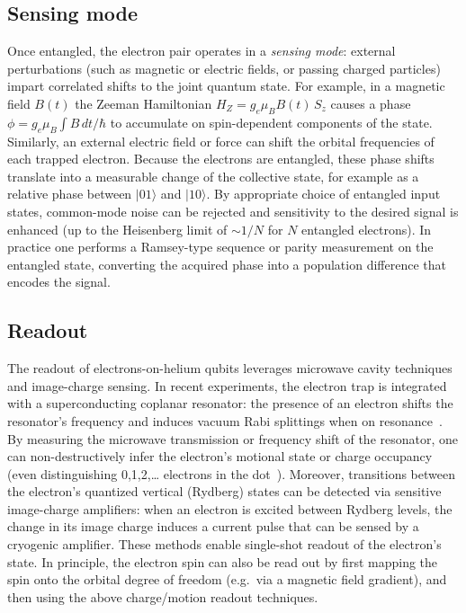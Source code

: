 \documentclass[fleqn,10pt]{wlscirep}
\begin{document}
\subsection{Sensing mode}

Once entangled, the electron pair operates in a {\it sensing mode}: external perturbations (such as magnetic or electric fields, or passing charged particles) impart correlated shifts to the joint quantum state.  For example, in a magnetic field $B(t)$ the Zeeman Hamiltonian $H_Z = g_e\mu_B B(t)\,S_z$ causes a phase $\phi = g_e\mu_B\int B\,dt/\hbar$ to accumulate on spin-dependent components of the state.  Similarly, an external electric field or force can shift the orbital frequencies of each trapped electron.  Because the electrons are entangled, these phase shifts translate into a measurable change of the collective state, for example as a relative phase between $|01\rangle$ and $|10\rangle$.  By appropriate choice of entangled input states, common-mode noise can be rejected and sensitivity to the desired signal is enhanced (up to the Heisenberg limit of $\sim1/N$ for $N$ entangled electrons).  In practice one performs a Ramsey-type sequence or parity measurement on the entangled state, converting the acquired phase into a population difference that encodes the signal.

\subsection{Readout}
The readout of electrons-on-helium qubits leverages microwave cavity techniques and image-charge sensing.  In recent experiments, the electron trap is integrated with a superconducting coplanar resonator: the presence of an electron shifts the resonator’s frequency and induces vacuum Rabi splittings when on resonance~\cite{koolstra2026strong}.  By measuring the microwave transmission or frequency shift of the resonator, one can non-destructively infer the electron’s motional state or charge occupancy (even distinguishing 0,1,2,… electrons in the dot~\cite{castoria2025}).  Moreover, transitions between the electron’s quantized vertical (Rydberg) states can be  detected via sensitive image-charge amplifiers: when an electron is excited between Rydberg levels, the change in its image charge induces a current pulse that can be sensed by a cryogenic amplifier.  These methods enable single-shot readout of the electron’s state.  In principle, the electron spin can also be read out by first mapping the spin onto the orbital degree of freedom (e.g.\ via a magnetic field gradient), and then using the above charge/motion readout techniques.
\end{document}

